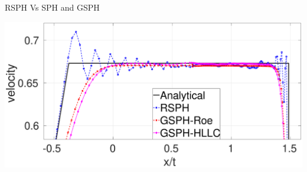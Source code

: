 \documentclass{beamer}
\begin{document}
\begin{frame}{RSPH Vs SPH and GSPH}
\begin{figure}[t]
\begin{minipage}{.33\textwidth}
    \end{minipage}%
\end{figure}

\begin{minipage}{0.35 \textwidth}
		\centering
        \includegraphics[width=0.99 \textwidth]{./Chapter-4/Figures/Sod/RCM-Sod-GSPH-compare-v-zoom}   
        

\end{minipage}
\end{frame}
\end{document}
